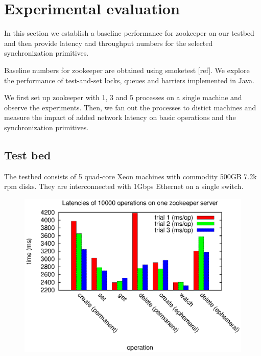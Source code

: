 \section{Experimental evaluation}\label{sec:eval}
In this section we establish a baseline performance for zookeeper on our
testbed and then provide latency and throughput numbers for the selected
synchronization primitives.

Baseline numbers for zookeeper are obtained using smoketest [ref]. We explore
the performance of test-and-set locks, queues and barriers implemented in Java.

We first set up zookeeper with 1, 3 and 5 processes on a single machine and
observe the experiments. Then, we fan out the processes to distict machines and
measure the impact of added network latency on basic operations and the
synchronization primitives. 

\subsection{Test bed}
The testbed consists of 5 quad-core Xeon  machines with commodity 500GB 7.2k rpm disks. They are interconnected with 1Gbps Ethernet on a single switch.


\begin{figure}[h]
\centering
\includegraphics[scale=0.75]{img/1_machine_1_server.eps}
\caption{}
\label{fig:1machine_1server_latency}
\end{figure}

